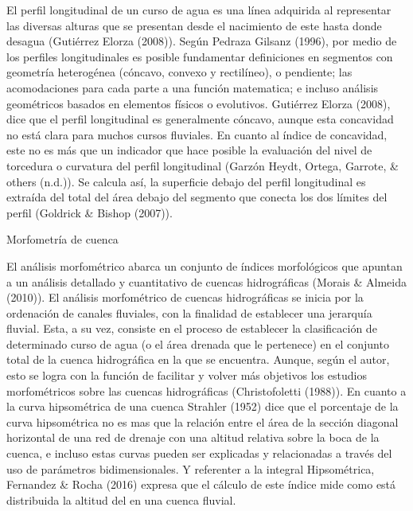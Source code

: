 \documentclass[11pt,]{article}
\begin{document}
El perfil longitudinal de un curso de agua es una línea adquirida al
representar las diversas alturas que se presentan desde el nacimiento de
este hasta donde desagua (Gutiérrez Elorza (2008)). Según Pedraza
Gilsanz (1996), por medio de los perfiles longitudinales es posible
fundamentar definiciones en segmentos con geometría heterogénea
(cóncavo, convexo y rectilíneo), o pendiente; las acomodaciones para
cada parte a una función matematica; e incluso análisis geométricos
basados en elementos físicos o evolutivos. Gutiérrez Elorza (2008), dice
que el perfil longitudinal es generalmente cóncavo, aunque esta
concavidad no está clara para muchos cursos fluviales. En cuanto al
índice de concavidad, este no es más que un indicador que hace posible
la evaluación del nivel de torcedura o curvatura del perfil longitudinal
(Garzón Heydt, Ortega, Garrote, \& others (n.d.)). Se calcula así, la
superficie debajo del perfil longitudinal es extraída del total del área
debajo del segmento que conecta los dos límites del perfil (Goldrick \&
Bishop (2007)).

Morfometría de cuenca

El análisis morfométrico abarca un conjunto de índices morfológicos que
apuntan a un análisis detallado y cuantitativo de cuencas hidrográficas
(Morais \& Almeida (2010)). El análisis morfométrico de cuencas
hidrográficas se inicia por la ordenación de canales fluviales, con la
finalidad de establecer una jerarquía fluvial. Esta, a su vez, consiste
en el proceso de establecer la clasificación de determinado curso de
agua (o el área drenada que le pertenece) en el conjunto total de la
cuenca hidrográfica en la que se encuentra. Aunque, según el autor, esto
se logra con la función de facilitar y volver más objetivos los estudios
morfométricos sobre las cuencas hidrográficas (Christofoletti (1988)).
En cuanto a la curva hipsométrica de una cuenca Strahler (1952) dice que
el porcentaje de la curva hipsométrica no es mas que la relación entre
el área de la sección diagonal horizontal de una red de drenaje con una
altitud relativa sobre la boca de la cuenca, e incluso estas curvas
pueden ser explicadas y relacionadas a través del uso de parámetros
bidimensionales. Y referenter a la integral Hipsométrica, Fernandez \&
Rocha (2016) expresa que el cálculo de este índice mide como está
distribuida la altitud del en una cuenca fluvial.
\end{document}
